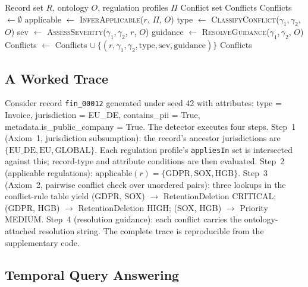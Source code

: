 \documentclass{ieeeaccess}
\begin{document}
\begin{algorithm}[t]
\caption{Conflict Detection}
\label{alg:conflict}
\begin{algorithmic}[1]
\Require Record set $R$, ontology $O$, regulation profiles $\Pi$
\Ensure Conflict set Conflicts
\State Conflicts $\gets \emptyset$
    \State applicable $\gets$ \textsc{InferApplicable}($r$, $\Pi$, $O$)
            \State type $\gets$ \textsc{ClassifyConflict}($\gamma_1, \gamma_2$, $O$)
            \State sev $\gets$ \textsc{AssessSeverity}($\gamma_1, \gamma_2$, $r$, $O$)
            \State guidance $\gets$ \textsc{ResolveGuidance}($\gamma_1, \gamma_2$, $O$)
            \State Conflicts $\gets$ Conflicts $\cup\ \{(r, \gamma_1, \gamma_2, \mathrm{type}, \mathrm{sev}, \mathrm{guidance})\}$
        \EndIf
    \EndFor
\EndFor
\State \Return Conflicts
\end{algorithmic}
\end{algorithm}

\subsection{A Worked Trace}

Consider record \texttt{fin\_00012} generated under seed 42 with attributes: type = Invoice, jurisdiction = EU\_DE, contains\_pii = True, metadata.is\_public\_company = True. The detector executes four steps. Step~1 (Axiom~1, jurisdiction subsumption): the record's ancestor jurisdictions are $\{\mathrm{EU\_DE, EU, GLOBAL}\}$. Each regulation profile's \texttt{appliesIn} set is intersected against this; record-type and attribute conditions are then evaluated. Step~2 (applicable regulations): $\mathrm{applicable}(r) = \{\mathrm{GDPR, SOX, HGB}\}$. Step~3 (Axiom~2, pairwise conflict check over unordered pairs): three lookups in the conflict-rule table yield (GDPR, SOX) $\rightarrow$ RetentionDeletion CRITICAL; (GDPR, HGB) $\rightarrow$ RetentionDeletion HIGH; (SOX, HGB) $\rightarrow$ Priority MEDIUM. Step~4 (resolution guidance): each conflict carries the ontology-attached resolution string. The complete trace is reproducible from the supplementary code.

\subsection{Temporal Query Answering}
\end{document}

